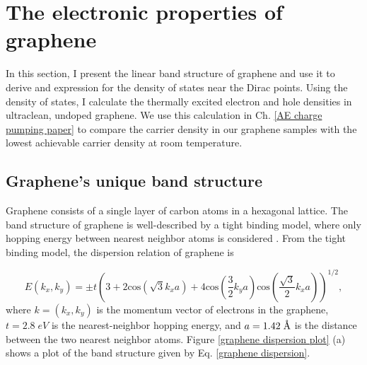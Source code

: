\documentclass[double,12pt,1in]{beavtex}
\begin{document}
\section{The electronic properties of graphene} \label{the electronic properties of graphene}
In this section, I present the linear band structure of graphene and use it to derive and expression for the density of states near the Dirac points. Using the density of states, I calculate the thermally excited electron and hole densities in ultraclean, undoped graphene. We use this calculation in Ch. \ref{AE charge pumping paper} to compare the carrier density in our graphene samples with the lowest achievable carrier density at room temperature.

\subsection{Graphene's unique band structure}

Graphene consists of a single layer of carbon atoms in a hexagonal lattice. The band structure of graphene is well-described by a tight binding model, where only hopping energy between nearest neighbor atoms is considered \cite{wallace_band_1947}. From the tight binding model, the dispersion relation of graphene is 

\begin{equation}
    E(k_x, k_y) = \pm t  \left(3 + 2\mathrm{cos}(\sqrt{3}k_x a) + 4\mathrm{cos}(\frac{3}{2}k_y a)\mathrm{cos}(\frac{\sqrt{3}}{2}k_x a)\right)^{1/2}, \label{graphene dispersion}
\end{equation}
where $k = (k_x, k_y)$ is the momentum vector of electrons in the graphene, $t = 2.8 \; eV$ is the nearest-neighbor hopping energy, and $a = 1.42 \;\SIUnitSymbolAngstrom$ is the distance between the two nearest neighbor atoms. Figure \ref{graphene dispersion plot} (a) shows a plot of the band structure given by Eq. \ref{graphene dispersion}.
\end{document}
